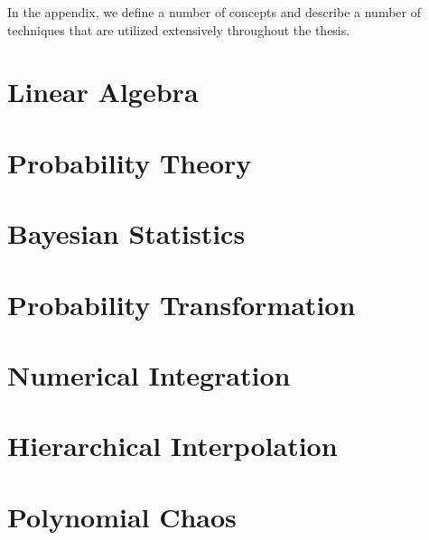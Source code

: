 In the appendix, we define a number of concepts and describe a number of
techniques that are utilized extensively throughout the thesis.

\section{Linear Algebra}

\section{Probability Theory}

\section{Bayesian Statistics}

\section{Probability Transformation}

\section{Numerical Integration}

\section{Hierarchical Interpolation}

\section{Polynomial Chaos}
